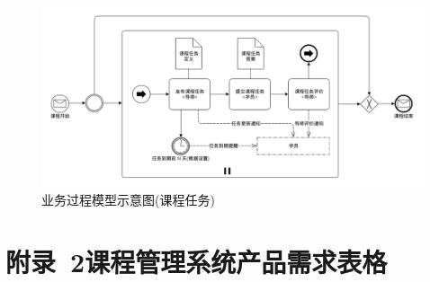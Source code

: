 \begin{figure}[!hbp]
  \begin{center}
    \includegraphics[width=\textwidth]{figures/diagram-bpm-course-task.png}
    \caption{业务过程模型示意图(课程任务)\label{BPMTask}}
  \end{center}
\end{figure}

\newpage

\section*{附录~2\quad	课程管理系统产品需求表格}
\label{sec:appendix-requirement-table}


\newpage

